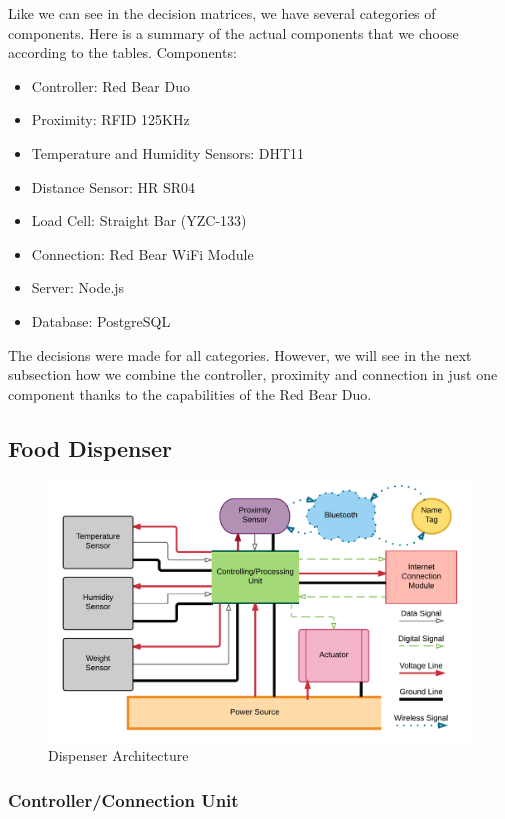 \documentclass[12pt]{article}
\begin{document}
Like we can see in the decision matrices, we have several categories of components. Here is a summary of the actual components that we choose according to the tables. Components:

\begin{itemize}
  \item Controller: Red Bear Duo
  \item Proximity: RFID 125KHz
  \item Temperature and Humidity Sensors: DHT11
  \item Distance Sensor: HR SR04
  \item Load Cell: Straight Bar (YZC-133)
  \item Connection: Red Bear WiFi Module
  \item Server: Node.js
  \item Database: PostgreSQL
\end{itemize}

The decisions were made for all categories. However, we will see in the next subsection how we combine the controller, proximity and connection in just one component thanks to the capabilities of the Red Bear Duo.

\subsection{Food Dispenser}

\begin{figure}[!htb]
  \includegraphics[width=\textwidth]{Figures/ArchitectureDispenser}
  \caption{Dispenser Architecture}
  \label{fig:ArchDispenser}
\end{figure}

\subsubsection{Controller/Connection Unit}
\end{document}
